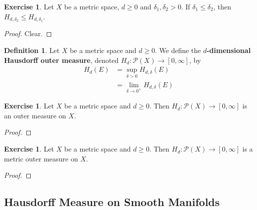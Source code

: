 \documentclass[12pt]{amsart}
\theoremstyle{definition}
\newtheorem{defn}[definition]{Definition}
\newtheorem{ex}[definition]{Exercise}
\newcommand{\del}{\delta}
\newcommand{\MP}{\mathcal{P}}
\begin{document}
	\begin{ex}
	Let $X$ be a metric space, $d \geq 0$ and $\del_1, \del_2 >0$. If $\del_1 \leq \del_2$, then $H_{d, \del_2} \leq H_{d, \del_1}$.
	\end{ex}
	
	\begin{proof}
	Clear.
	\end{proof}
	
	\begin{defn}
	Let $X$ be a metric space and $d \geq 0$. We define the \textbf{$d$-dimensional Hausdorff outer measure}, denoted $H_{d}: \MP(X) \rightarrow [0, \infty]$, by 
	\begin{align*}
	H_{d}(E) 
	&= \sup_{\del > 0} H_{d, \del}(E) \\
	&= \lim_{\del \rightarrow 0^+} H_{d, \del}(E)
	\end{align*}
	\end{defn}
	
	\begin{ex}
	Let $X$ be a metric space and $d \geq 0$. Then $H_d: \MP(X) \rightarrow [0, \infty]$ is an outer measure on $X$.
	\end{ex}
	
	\begin{proof}
	
	\end{proof}
	
	\begin{ex}
	Let $X$ be a metric space and $d \geq 0$. Then $H_d: \MP(X) \rightarrow [0, \infty]$ is a metric outer measure on $X$.
	\end{ex}
	
	\begin{proof}
	
	\end{proof}
	
	
	
	
	
	
	
	
	
	
	
	
	
	
	
	
	
	
	\newpage
	\subsection{Hausdorff Measure on Smooth Manifolds}
	
	
	
	
	
	
	
\end{document}
